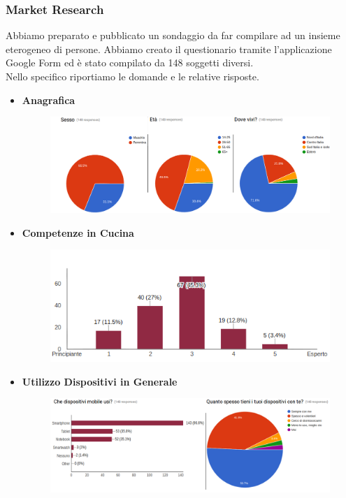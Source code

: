 \subsubsection{Market Research}
Abbiamo preparato e pubblicato un sondaggio da far compilare ad un
insieme eterogeneo di persone. Abbiamo creato il questionario tramite
l'applicazione Google Form ed è stato compilato da 148
soggetti diversi.\\

Nello specifico riportiamo le domande e le relative risposte.
\begin{itemize}
	\item\textbf{Anagrafica}
		\begin{figure} [H]	
			\centering
			\includegraphics[width=\textwidth]{img/survey-123.png}
		\end{figure}
	\item\textbf{Competenze in Cucina}
		\begin{figure} [H]	
			\centering
			\includegraphics[scale=0.65]{img/survey-4.png}
		\end{figure}
	\item\textbf{Utilizzo Dispositivi in Generale}
		\begin{figure} [H]	
			\centering
			\includegraphics[scale=0.45]{img/survey-56.png}

\end{figure}
\end{itemize}
